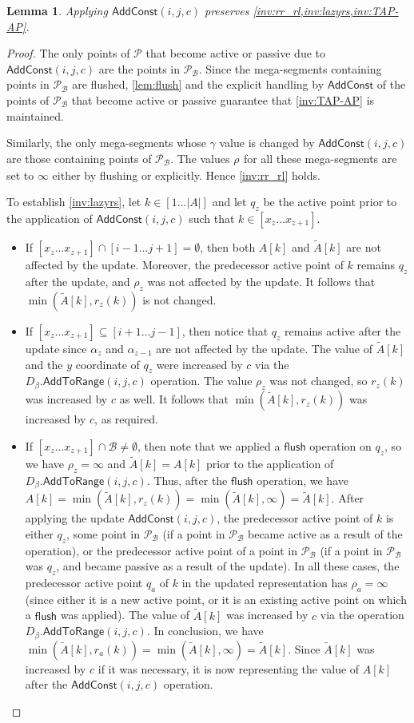 \documentclass[10pt,a4paper]{article}
\newtheorem{lemma}[theorem]{Lemma}
\newcommand{\AC}{\mathsf{AddConst}}
\newcommand{\AtR}{\mathsf{AddToRange}}
\renewcommand{\P}{\mathcal{P}}
\newcommand{\Dbeta}{D_{\beta}}
\newcommand{\TA}{\tilde{A}}
\newcommand{\B}{\mathcal{B}}
\newcommand{\ray}{r}
\newcommand{\rl}[1]{\rho_{#1}}
\newcommand{\flush}{\mathsf{flush}}
\begin{document}
\begin{lemma}\label{lem:addconst}
    Applying $\AC(i,j,c)$ preserves \cref{inv:rr_rl,inv:lazyrs,inv:TAP-AP}.
\end{lemma}
\begin{proof}
The only points of $\P$ that become active or passive due to $\AC(i,j,c)$ are the points in $\P_{\B}$. Since the mega-segments containing points in $\P_{\B}$ are flushed, \cref{lem:flush} and the explicit handling by $\AC$ of the points of $\P_{\B}$ that become active or passive guarantee that \cref{inv:TAP-AP} is maintained. 

Similarly, the only mega-segments whose $\gamma$ value is changed by $\AC(i,j,c)$ are those containing points of $\P_{\B}$.
The values $\rl{}$ for all these mega-segments are set to $\infty$ either by flushing or explicitly. Hence \cref{inv:rr_rl} holds.

To establish \cref{inv:lazyrs}, 
let $k\in [1\ldots |A|]$ and let $q_z$ be the active point prior to the application of $\AC(i,j,c)$ such that $k\in [x_z \ldots x_{z+1}]$.
\begin{itemize}
    \item If $[x_z \ldots x_{z+1}] \cap [i-1\ldots j + 1] = \emptyset$, then both $A[k]$ and $\TA[k]$  are  not affected by the update.
    Moreover, the predecessor active point of $k$ remains $q_z$ after the update, and $\rl{z}$ was not affected by the update.
    It follows that $\min(\TA[k], \ray_z(k))$ is not changed.
    \item If $[x_z \ldots x_{z+1}] \subseteq [i+1 \ldots j-1]$, then notice that $q_z$ remains active after the update since $\alpha_z$ and $\alpha_{z-1}$ are not affected by the update.
    The value of $\TA[k]$ and the $y$ coordinate of $q_z$ were increased by $c$ via the $\Dbeta.\AtR(i,j,c)$ operation.
    The value $\rl{z}$ was not changed, so $\ray_z(k)$ was increased by $c$ as well.
    It follows that $\min(\TA[k],\ray_z(k))$ was increased by $c$, as required.
    \item If $[x_z \ldots x_{z+1}] \cap \B \neq \emptyset$, then note that we applied a $\flush$ operation on $q_z$, so we have $\rl{z} = \infty$ and $\TA[k] = A[k]$ prior to the application of $\Dbeta.\AtR(i,j,c)$.
    Thus, after the $\flush$ operation, we have $A[k]=\min(\TA[k],\ray_z(k))=\min(\TA[k],\infty)=\TA[k]$.
    After applying the update $\AC(i,j,c)$, the predecessor active point of $k$ is either $q_z$, some point in $\P_{\B}$ (if a point in $\P_{\B}$ became active as a result of the operation), or the predecessor active point of a point in $\P_{\B}$ (if a point in $\P_{\B}$ was $q_z$, and became passive as a result of the update). 
    In all these cases, the predecessor active point $q_a$ of $k$ in the updated representation has $\rl{a} = \infty$ (since either it is a new active point, or it is an existing active point on which a $\flush$ was applied).
    The value of $\TA[k]$ was increased by $c$ via the operation $\Dbeta.\AtR(i,j,c)$. 
    In conclusion, we have $\min(\TA[k],\ray_a(k)) = \min(\TA[k],\infty) = \TA[k]$.
    Since $\TA[k]$ was increased by $c$ if it was necessary, it is now representing the value of $A[k]$ after the $\AC(i,j,c)$ operation.\qedhere 
\end{itemize}


\end{proof}
\end{document}

